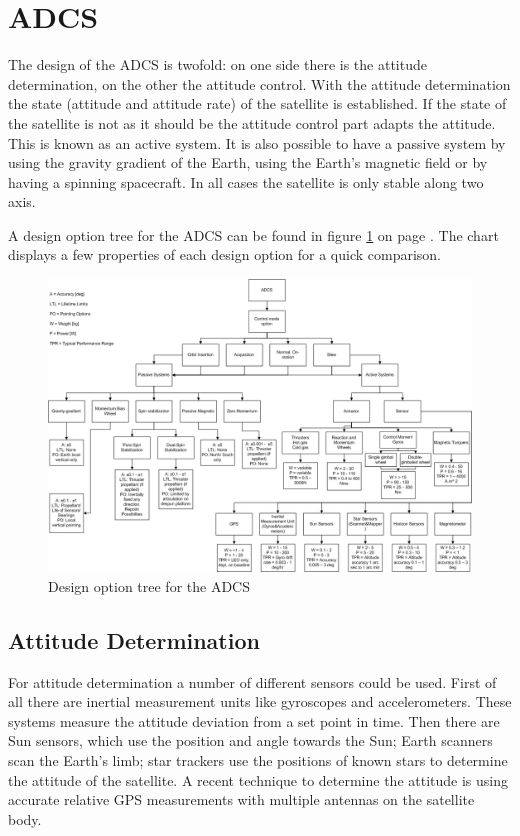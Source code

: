 \section{ADCS}
\label{sect_adcs}
The design of the \ac{ADCS} is twofold: on one side there is the attitude determination, on the other the attitude control. With the attitude determination the state (attitude and attitude rate) of the satellite is established. If the state of the satellite is not as it should be the attitude control part adapts the attitude. This is known as an active system. It is also possible to have a passive system by using the gravity gradient of the Earth, using the Earth's magnetic field or by having a spinning spacecraft. In all cases the satellite is only stable along two axis. 

A design option tree for the \ac{ADCS} can be found in figure \ref{pic_DOTadcs} on page \pageref{pic_DOTadcs}. The chart displays a few properties of each design option for a quick comparison.

\begin{figure}[!ht]
\centering
\includegraphics[width=0.9\textheight, angle=90]{chapters/img/DOTadcs.png}
\caption{Design option tree for the \ac{ADCS}}
\label{pic_DOTadcs}
\end{figure}

\subsection{Attitude Determination}
For attitude determination a number of different sensors could be used. First of all there are inertial measurement units like gyroscopes and accelerometers. These systems measure the attitude deviation from a set point in time. Then there are Sun sensors, which use the position and angle towards the Sun;  Earth scanners scan the Earth's limb; star trackers use the positions of known stars to determine the attitude of the satellite. A recent technique to determine the attitude is using accurate relative \ac{GPS} measurements with multiple antennas on the satellite body.

